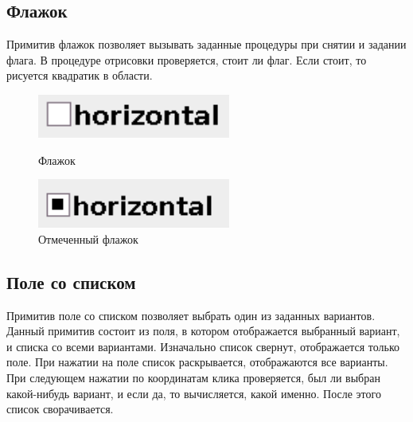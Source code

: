 \documentclass[14pt]{extarticle}
\begin{document}
	\subsection{Флажок}
	Примитив флажок позволяет вызывать заданные процедуры при снятии и задании флага. В процедуре отрисовки проверяется, стоит ли флаг. Если стоит, то рисуется квадратик в области.
		\begin{figure}[h]
		\begin{center}
		\begin{minipage}[h]{0.4\linewidth}
		\includegraphics[width=180pt]{pictures/checkBox1.png}
		\caption{Флажок} %
		\label{ris:b1} %
		\end{minipage}
		\hfill 
		\begin{minipage}[h]{0.4\linewidth}
		\includegraphics[width=180pt]{pictures/checkBox2.png}
		\caption{Отмеченный флажок}
		\label{ris:b2}
		\end{minipage}
		\end{center}
		\end{figure}	
			
		
	\pagebreak		
	\subsection{Поле со списком}
	Примитив поле со списком позволяет выбрать один из заданных вариантов. Данный примитив состоит из поля, в котором отображается выбранный вариант, и списка со всеми вариантами. Изначально список свернут, отображается только поле. При нажатии на поле список раскрывается, отображаются все варианты. При следующем нажатии по координатам клика проверяется, был ли выбран какой-нибудь вариант, и если да, то вычисляется, какой именно. После этого список сворачивается. 
	
\end{document}
